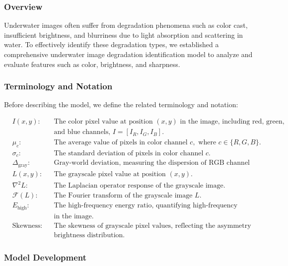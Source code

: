 \documentclass{apmcmthesis}
\begin{document}
\subsubsection{Overview}

Underwater images often suffer from degradation phenomena such as color cast, insufficient brightness, and blurriness due to light absorption and scattering in water. To effectively identify these degradation types, we established a comprehensive underwater image degradation identification model to analyze and evaluate features such as color, brightness, and sharpness.

\subsubsection{Terminology and Notation}
Before describing the model, we define the related terminology and notation:

\begin{align*}
    &I(x, y): &&\text{The color pixel value at position } (x, y) \text{ in the image, including red, green,} \\
    &&&\text{and blue channels, } I = [I_R, I_G, I_B]. \\
    &\mu_c: &&\text{The average value of pixels in color channel } c, \text{ where } c \in \{R, G, B\}. \\
    &\sigma_c: &&\text{The standard deviation of pixels in color channel } c. \\
    &\Delta_{\text{gray}}: &&\text{Gray-world deviation, measuring the dispersion of RGB channel averages.} \\
    &L(x, y): &&\text{The grayscale pixel value at position } (x, y). \\
    &\nabla^2 L: &&\text{The Laplacian operator response of the grayscale image.} \\
    &\mathcal{F}(L): &&\text{The Fourier transform of the grayscale image } L. \\
    &E_{\text{high}}: &&\text{The high-frequency energy ratio, quantifying high-frequency components} \\
    &&&\text{in the image.} \\
    &\text{Skewness}: &&\text{The skewness of grayscale pixel values, reflecting the asymmetry of} \\
    &&&\text{brightness distribution.}
\end{align*}


\subsubsection{Model Development}
\end{document}
